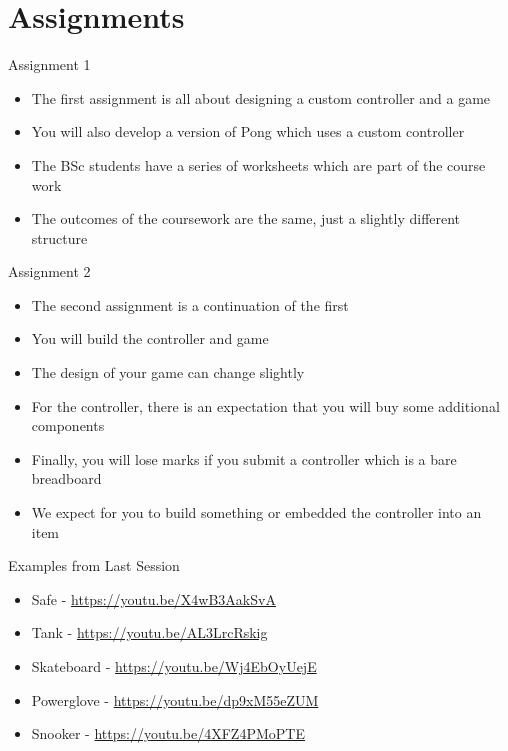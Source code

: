 \part{Assignments}
\frame{\partpage}

\begin{frame}{Assignment 1}
\begin{itemize}
	\pause \item The first assignment is all about designing a custom controller and a game
	\pause \item You will also develop a version of Pong which uses a custom controller
	\pause \item The BSc students have a series of worksheets which are part of the course work
	\pause \item The outcomes of the coursework are the same, just a slightly different structure
\end{itemize}
\end{frame}


\begin{frame}{Assignment 2}
\begin{itemize}
	\pause \item The second assignment is a continuation of the first
	\pause \item You will build the controller and game
	\pause \item The design of your game can change slightly
	\pause \item For the controller, there is an expectation that you will buy some additional components
	\pause \item Finally, you will lose marks if you submit a controller which is a bare breadboard
	\pause \item We expect for you to build something or embedded the controller into an item
\end{itemize}
\end{frame}

\begin{frame}{Examples from Last Session}
\begin{itemize}
	\item Safe - \url{https://youtu.be/X4wB3AakSvA}
	\item Tank - \url{https://youtu.be/AL3LrcRskig}
	\item Skateboard - \url{https://youtu.be/Wj4EbOyUejE}
	\item Powerglove - \url{https://youtu.be/dp9xM55eZUM}
	\item Snooker -  \url{https://youtu.be/4XFZ4PMoPTE}
\end{itemize}
\end{frame}